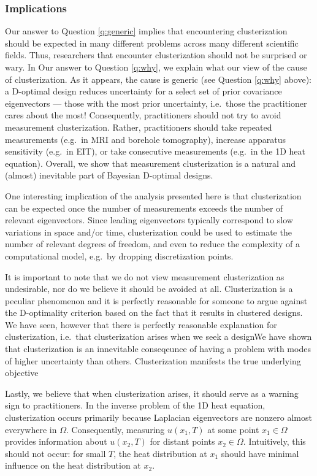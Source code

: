 \documentclass[ba]{imsart}
\theoremstyle{plain}
\theoremstyle{definition}
\theoremstyle{remark}
\begin{document}
\subsubsection{Implications}
Our answer to Question \ref{q:generic} implies that encountering
clusterization should be expected in many different problems across
many different scientific fields. Thus, researchers that encounter
clusterization should not be surprised or wary. In Our answer to
Question \ref{q:why}, we explain what our view of the cause of
clusterization. As it appears, the cause is generic (see Question
\ref{q:why} above): a D-optimal design reduces uncertainty for a
select set of prior covariance eigenvectors --- those with the most
prior uncertainty, i.e.~those the practitioner cares about the most!
Consequently, practitioners should not try to avoid measurement
clusterization. Rather, practitioners should take repeated
measurements (e.g.~in MRI and borehole tomography), increase apparatus
sensitivity (e.g.~in EIT), or take consecutive measurements (e.g.~in
the 1D heat equation). Overall, we show that measurement
clusterization is a natural and (almost) inevitable part of Bayesian
D-optimal designs.

One interesting implication of the analysis presented here is that
clusterization can be expected once the number of measurements exceeds
the number of relevant eigenvectors. Since leading eigenvectors
typically correspond to slow variations in space and/or time,
clusterization could be used to estimate the number of relevant
degrees of freedom, and even to reduce the complexity of a
computational model, e.g.~by dropping discretization points.

It is important to note that we do not view measurement clusterization
as undesirable, nor do we believe it should be avoided at
all. Clusterization is a peculiar phenomenon and it is perfectly
reasonable for someone to argue against the D-optimality criterion
based on the fact that it results in clustered designs. We have seen,
however that there is perfectly reasonable explanation for
clusterization, i.e.~that clusterization arises when we seek a
designWe have shown that clusterization is an innevitable conseqeunce
of having a problem with modes of higher uncertainty than
others. Clusterization manifests the true underlying objective

Lastly, we believe that when clusterization arises, it should serve as
a warning sign to practitioners. In the inverse problem of the 1D heat
equation, clusterization occurs primarily because Laplacian
eigenvectors are nonzero almost everywhere in $\Omega$. Consequently,
measuring $u(x_1, T)$ at some point $x_1 \in \Omega$ provides
information about $u(x_2,T)$ for distant points $x_2 \in
\Omega$. Intuitively, this should not occur: for small $T$, the heat
distribution at $x_1$ should have minimal influence on the heat
distribution at $x_2$.
\end{document}
